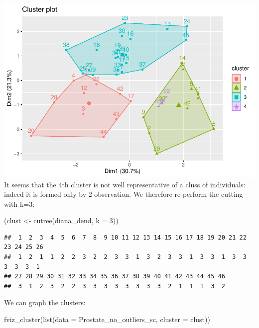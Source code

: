 \documentclass[
]{article}
\newenvironment{Shaded}{\begin{snugshade}}{\end{snugshade}}
\newcommand{\AttributeTok}[1]{\textcolor[rgb]{0.77,0.63,0.00}{#1}}
\newcommand{\DecValTok}[1]{\textcolor[rgb]{0.00,0.00,0.81}{#1}}
\newcommand{\FunctionTok}[1]{\textcolor[rgb]{0.00,0.00,0.00}{#1}}
\newcommand{\NormalTok}[1]{#1}
\newcommand{\OtherTok}[1]{\textcolor[rgb]{0.56,0.35,0.01}{#1}}
\begin{document}
\includegraphics{clustering_files/figure-latex/unnamed-chunk-41-1.pdf}
It seems that the 4th cluster is not well representative of a cluss of
individuals: indeed it is formed only by 2 observation. We therefore
re-perform the cutting with k=3:

\begin{Shaded}
\begin{Highlighting}[]
\NormalTok{(clust }\OtherTok{\textless{}{-}} \FunctionTok{cutree}\NormalTok{(diana\_dend, }\AttributeTok{k =} \DecValTok{3}\NormalTok{)) }
\end{Highlighting}
\end{Shaded}

\begin{verbatim}
##  1  2  3  4  5  6  7  8  9 10 11 12 13 14 15 16 17 18 19 20 21 22 23 24 25 26 
##  1  2  1  1  2  2  3  2  2  3  3  1  3  2  3  3  1  3  3  1  3  3  3  3  3  1 
## 27 28 29 30 31 32 33 34 35 36 37 38 39 40 41 42 43 44 45 46 
##  3  1  2  3  2  2  3  3  3  3  3  3  3  3  2  1  1  1  3  2
\end{verbatim}

We can graph the clusters:

\begin{Shaded}
\begin{Highlighting}[]
\FunctionTok{fviz\_cluster}\NormalTok{(}\FunctionTok{list}\NormalTok{(}\AttributeTok{data =}\NormalTok{ Prostate\_no\_outliers\_sc, }\AttributeTok{cluster =}\NormalTok{ clust))}
\end{Highlighting}
\end{Shaded}
\end{document}
